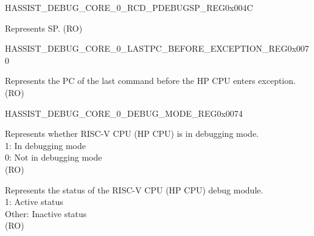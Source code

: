 \begin{register}{H}{ASSIST\_DEBUG\_CORE\_0\_RCD\_PDEBUGSP\_REG}{0x004C}\label{regdesc:ASSISTDEBUGCORE0RCDPDEBUGSPREG}
%
\regnewline%
\begin{regdesc}\begin{reglist}
\label{fielddesc:ASSISTDEBUGCORE0RCDPDEBUGSP}\item [ASSIST\_DEBUG\_CORE\_0\_RCD\_PDEBUGSP] Represents SP. (RO)
\end{reglist}\end{regdesc}
\end{register}


\begin{register}{H}{ASSIST\_DEBUG\_CORE\_0\_LASTPC\_BEFORE\_EXCEPTION\_REG}{0x0070}\label{regdesc:ASSISTDEBUGCORE0LASTPCBEFOREEXCEPTIONREG}
%
\regnewline%
\begin{regdesc}\begin{reglist}
\label{fielddesc:ASSISTDEBUGCORE0LASTPCBEFOREEXC}\item [ASSIST\_DEBUG\_CORE\_0\_LASTPC\_BEFORE\_EXC] Represents the PC of the last command before the HP CPU enters exception. (RO)
\end{reglist}\end{regdesc}
\end{register}


\begin{register}{H}{ASSIST\_DEBUG\_CORE\_0\_DEBUG\_MODE\_REG}{0x0074}\label{regdesc:ASSISTDEBUGCORE0DEBUGMODEREG}
%
%
%
\regnewline%
\begin{regdesc}\begin{reglist}
\label{fielddesc:ASSISTDEBUGCORE0DEBUGMODE}\item [ASSIST\_DEBUG\_CORE\_0\_DEBUG\_MODE] Represents whether RISC-V CPU (HP CPU) is in debugging mode.\\
1: In debugging mode\\
0: Not in debugging mode\\
(RO)
\label{fielddesc:ASSISTDEBUGCORE0DEBUGMODULEACTIVE}\item [ASSIST\_DEBUG\_CORE\_0\_DEBUG\_MODULE\_ACTIVE] Represents the status of the RISC-V CPU (HP CPU) debug module.\\
1: Active status\\
Other: Inactive status\\
(RO)
\end{reglist}\end{regdesc}
\end{register}


